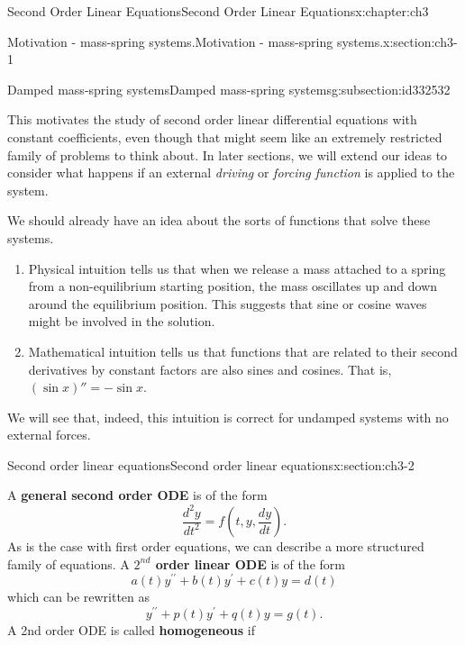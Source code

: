 \documentclass[oneside,10pt,]{book}
\newcommand{\terminology}[1]{\textbf{#1}}
\numberwithin{equation}{section}
\numberwithin{equation}{section}
\begin{document}
\begin{chapterptx}{Second Order Linear Equations}{}{Second Order Linear Equations}{}{}{x:chapter:ch3}
\begin{sectionptx}{Motivation - mass-spring systems.}{}{Motivation - mass-spring systems.}{}{}{x:section:ch3-1}
\begin{subsectionptx}{Damped mass-spring systems}{}{Damped mass-spring systems}{}{}{g:subsection:id332532}
\par
This motivates the study of second order linear differential equations with constant coefficients, even though that might seem like an extremely restricted family of problems to think about. In later sections, we will extend our ideas to consider what happens if an external \emph{driving} or \emph{forcing function} is applied to the system.%
\par
We should already have an idea about the sorts of functions that solve these systems.%
\begin{enumerate}
\item{}Physical intuition tells us that when we release a mass attached to a spring from a non-equilibrium starting position, the mass oscillates up and down around the equilibrium position. This suggests that sine or cosine waves might be involved in the solution.%
\item{}Mathematical intuition tells us that functions that are related to their second derivatives by constant factors are also sines and cosines. That is, \((\sin x)'' = - \sin x\).%
\end{enumerate}
We will see that, indeed, this intuition is correct for undamped systems with no external forces.%
\end{subsectionptx}
\end{sectionptx}
%
%
\typeout{************************************************}
\typeout{************************************************}
%
\begin{sectionptx}{Second order linear equations}{}{Second order linear equations}{}{}{x:section:ch3-2}
\begin{introduction}{}%
A \terminology{general second order ODE} is of the form%
\begin{equation*}
\frac{d^{2}y}{dt^{2}}=f\left(t,y,\frac{dy}{dt}\right).
\end{equation*}
As is the case with first order equations, we can describe a more structured family of equations. A \terminology{\(2^{nd}\) order linear ODE} is of the form%
\begin{equation*}
a(t)y^{\prime\prime}+b(t)y^{\prime}+c(t)y=d(t)
\end{equation*}
which can be rewritten as%
\begin{equation*}
y^{\prime\prime}+p(t)y^{\prime}+q(t)y=g(t).
\end{equation*}
A 2nd order ODE is called \terminology{homogeneous} if%
\begin{equation*}

\end{equation*}
\end{introduction}
\end{sectionptx}
\end{chapterptx}
\end{document}
